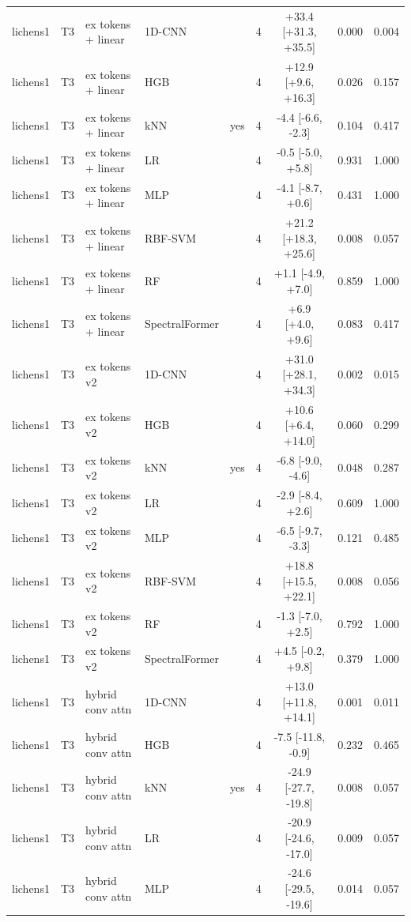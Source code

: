 \begin{tabular}{lllllcccc}
lichens1 & T3 & ex tokens + linear & 1D-CNN &  & 4 & +33.4 [+31.3, +35.5] & 0.000 & 0.004 \\
lichens1 & T3 & ex tokens + linear & HGB &  & 4 & +12.9 [+9.6, +16.3] & 0.026 & 0.157 \\
lichens1 & T3 & ex tokens + linear & kNN & yes & 4 & -4.4 [-6.6, -2.3] & 0.104 & 0.417 \\
lichens1 & T3 & ex tokens + linear & LR &  & 4 & -0.5 [-5.0, +5.8] & 0.931 & 1.000 \\
lichens1 & T3 & ex tokens + linear & MLP &  & 4 & -4.1 [-8.7, +0.6] & 0.431 & 1.000 \\
lichens1 & T3 & ex tokens + linear & RBF-SVM &  & 4 & +21.2 [+18.3, +25.6] & 0.008 & 0.057 \\
lichens1 & T3 & ex tokens + linear & RF &  & 4 & +1.1 [-4.9, +7.0] & 0.859 & 1.000 \\
lichens1 & T3 & ex tokens + linear & SpectralFormer &  & 4 & +6.9 [+4.0, +9.6] & 0.083 & 0.417 \\
lichens1 & T3 & ex tokens v2 & 1D-CNN &  & 4 & +31.0 [+28.1, +34.3] & 0.002 & 0.015 \\
lichens1 & T3 & ex tokens v2 & HGB &  & 4 & +10.6 [+6.4, +14.0] & 0.060 & 0.299 \\
lichens1 & T3 & ex tokens v2 & kNN & yes & 4 & -6.8 [-9.0, -4.6] & 0.048 & 0.287 \\
lichens1 & T3 & ex tokens v2 & LR &  & 4 & -2.9 [-8.4, +2.6] & 0.609 & 1.000 \\
lichens1 & T3 & ex tokens v2 & MLP &  & 4 & -6.5 [-9.7, -3.3] & 0.121 & 0.485 \\
lichens1 & T3 & ex tokens v2 & RBF-SVM &  & 4 & +18.8 [+15.5, +22.1] & 0.008 & 0.056 \\
lichens1 & T3 & ex tokens v2 & RF &  & 4 & -1.3 [-7.0, +2.5] & 0.792 & 1.000 \\
lichens1 & T3 & ex tokens v2 & SpectralFormer &  & 4 & +4.5 [-0.2, +9.8] & 0.379 & 1.000 \\
lichens1 & T3 & hybrid conv attn & 1D-CNN &  & 4 & +13.0 [+11.8, +14.1] & 0.001 & 0.011 \\
lichens1 & T3 & hybrid conv attn & HGB &  & 4 & -7.5 [-11.8, -0.9] & 0.232 & 0.465 \\
lichens1 & T3 & hybrid conv attn & kNN & yes & 4 & -24.9 [-27.7, -19.8] & 0.008 & 0.057 \\
lichens1 & T3 & hybrid conv attn & LR &  & 4 & -20.9 [-24.6, -17.0] & 0.009 & 0.057 \\
lichens1 & T3 & hybrid conv attn & MLP &  & 4 & -24.6 [-29.5, -19.6] & 0.014 & 0.057 \\

\end{tabular}
